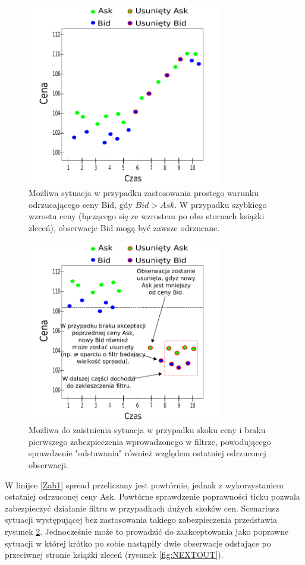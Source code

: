 \documentclass[a4paper,12pt,openany, DIV=calc, headsepline]{scrbook}
\begin{document}
\begin{figure}[h]
  \centering
  \includegraphics[width=85mm, height=80mm]{wykresy/cross}
  \caption{Możliwa sytuacja w przypadku zastosowania prostego warunku odrzucającego ceny Bid, gdy $Bid > Ask$. W przypadku szybkiego wzrostu ceny (łączącego się ze wzrostem po obu stornach książki zleceń), obserwacje Bid mogą być zawsze odrzucane.}
  \label{fig:Cross}
\end{figure}

\begin{figure}[h]
  \centering
  \includegraphics[width=85mm, height=80mm]{wykresy/relacjaBIDASK}
  \caption{Możliwa do zaistnienia sytuacja w przypadku skoku ceny i braku pierwszego zabezpieczenia wprowadzonego w filtrze, powodującego sprawdzenie "odstawania" również względem ostatniej odrzuconej obserwacji.}
  \label{fig:JUMP}
\end{figure}


W linijce \ref{Zab1} spread przeliczany jest powtórnie, jednak z wykorzystaniem ostatniej odrzuconej ceny Ask. Powtórne sprawdzenie poprawności ticku pozwala zabezpieczyć działanie filtru w przypadkach dużych skoków cen. Scenariusz sytuacji występującej bez zastosowania takiego zabezpieczenia przedstawia rysunek \ref{fig:JUMP}. Jednocześnie może to prowadzić do zaakceptowania jako poprawne sytuacji w której krótko po sobie nastąpiły dwie obserwacje odstające po przeciwnej stronie książki zleceń (rysunek \ref{fig:NEXTOUT}).
\end{document}
